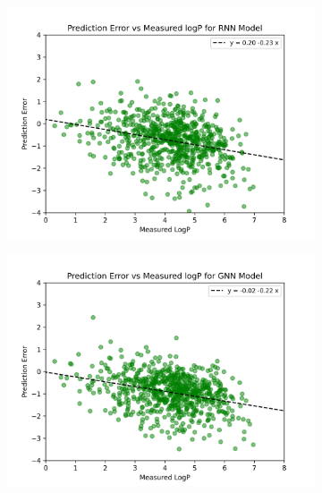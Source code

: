 \documentclass{article}
\begin{document}
\begin{figure}
\bigskip %
\begin{subfigure}[t]{0.45\textwidth}
    \includegraphics[width=\linewidth]{./../plots/martel_errors_rnn.png}
\end{subfigure}\hspace{\fill} %
\begin{subfigure}[t]{0.45\textwidth}
    \includegraphics[width=\linewidth]{./../plots/martel_errors_gnn.png}
\end{subfigure}


\end{figure}
\end{document}
